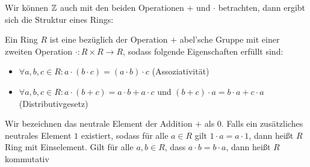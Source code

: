Wir können \(\mathbb{Z}\) auch mit den beiden Operationen \(+\) und \(\cdot\) betrachten, dann ergibt sich die Struktur eines Rings:
\label{grundlagen/zahlensysteme:definition-6}
\begin{definition}{}{}



Ein Ring \(R\) ist eine bezüglich der Operation \(+\) abel’sche Gruppe mit einer zweiten Operation \(\cdot : R \times R \rightarrow R\), sodass folgende Eigenschaften erfüllt sind:
\begin{itemize}
\item {} 
\( \forall a,b,c \in R: a \cdot (b \cdot c) = (a\cdot b) \cdot c\) (Assoziativität)

\item {} 
\( \forall a,b,c \in R: a \cdot (b+c) = a\cdot b + a \cdot c\) und \((b+c) \cdot a = b \cdot a + c \cdot a\) (Distributivgesetz)

\end{itemize}

Wir bezeichnen das neutrale Element der Addition \(+\) als 0.
Falls ein zusätzliches neutrales Element \(1\) existiert, sodass für alle \(a  \in R\) gilt \(1 \cdot a = a \cdot 1\), dann
heißt \(R\) Ring mit Einselement. Gilt für alle \(a, b  \in R\), dass \(a \cdot b = b \cdot a\), dann heißt \(R\) kommutativ
\end{definition}

